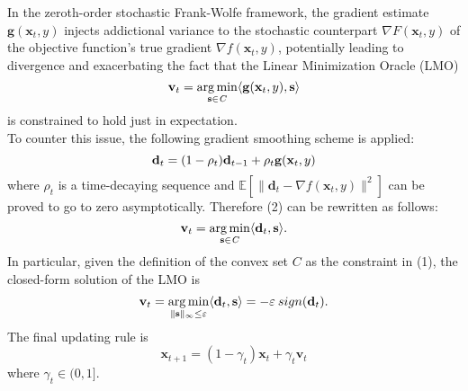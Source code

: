 In the zeroth-order stochastic Frank-Wolfe framework, the gradient estimate $\mathbf{g}(\mathbf{x}_t,y)$ injects addictional variance to the stochastic counterpart $\nabla F(\mathbf{x}_t,y)$ of the objective function's true gradient $\nabla f(\mathbf{x}_{t},y)$, potentially leading to divergence and exacerbating the fact that the Linear Minimization Oracle (LMO)
\begin{equation}
	\mathbf{v}_t = \operatorname*{arg\,min}_{\mathbf{s}\in\mathit{C}}\langle \mathbf{g}(\mathbf{x}_t,y),\mathbf{s}\rangle	
\end{equation}
is constrained to hold just in expectation.\\ 
\indent To counter this issue, the following gradient smoothing scheme is applied:
\begin{equation}
	\mathbf{d}_{t} = (1-\rho_t)\mathbf{d}_{t-1} + \rho_t\mathbf{g}(\mathbf{x}_t,y)\\
\end{equation}
where $\rho_t$ is a time-decaying sequence and $\mathbb{E}[\lVert\mathbf{d}_{t}-\nabla f(\mathbf{x}_{t},y) \rVert^2]$ can be proved to go to zero asymptotically. Therefore (2) can be rewritten as follows:
\begin{equation}
	\mathbf{v}_t = \operatorname*{arg\,min}_{\mathbf{s}\in\mathit{C}}\langle \mathbf{d}_t,\mathbf{s}\rangle.
\end{equation}
In particular, given the definition of the convex set $\mathit{C}$ as the constraint in (1), the closed-form solution of the LMO is 
\begin{equation}
	\mathbf{v}_t = \operatorname*{arg\,min}_{\lVert \mathbf{s}\rVert_{\infty}\leq\varepsilon}\langle \mathbf{d}_t,\mathbf{s}\rangle= -\varepsilon \:sign(\mathbf{d}_{t}).	
\end{equation}
The final updating rule is
\begin{equation}
	\mathbf{x}_{t+1} = (1-\gamma_t)\mathbf{x}_t + \gamma_t\mathbf{v}_t
\end{equation}
where $\gamma_t\in(0,1]$.